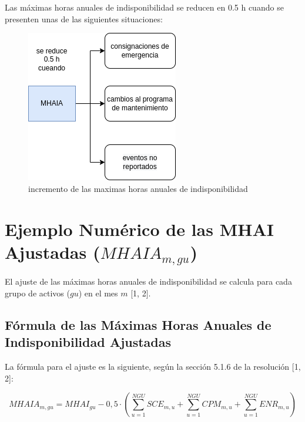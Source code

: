 \documentclass[a5paper]{book}%
\begin{document}
   Las máximas horas anuales de indisponibilidad  se reducen en 0.5 h cuando se presenten unas de las siguientes situaciones:
  
  \begin{figure}[H]
    \centering
    \caption{incremento de las maximas horas anuales de indisponibilidad}
    \label{fig:mhaia}
    \includegraphics[width=0.6\linewidth]{MHAIA}
  \end{figure}

\section*{Ejemplo Numérico de las MHAI Ajustadas ($MHAI A_{m, gu}$)}

El ajuste de las máximas horas anuales de indisponibilidad se calcula para cada grupo de activos ($gu$) en el mes $m$ [1, 2].

\subsection*{Fórmula de las Máximas Horas Anuales de Indisponibilidad Ajustadas}

La fórmula para el ajuste es la siguiente, según la sección 5.1.6 de la resolución [1, 2]:

\begin{equation}
	\label{eq:mhaia}
	MHAI A_{m, gu} = MHAI_{gu} - 0,5 \cdot \left( \sum_{u=1}^{NGU} SCE_{m, u} + \sum_{u=1}^{NGU} CPM_{m, u} + \sum_{u=1}^{NGU} ENR_{m, u} \right)
\end{equation}
\end{document}
